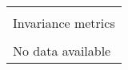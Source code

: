 \begin{tabular}{l}
\toprule\\
Invariance metrics\\
\midrule\\
No data available\\
\bottomrule
\end{tabular}
